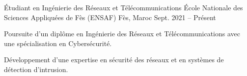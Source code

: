 
\begin{cventries}

  \cventry
  {Étudiant en Ingénierie des Réseaux et Télécommunications} %
  {École Nationale des Sciences Appliquées de Fès (ENSAF)} %
  {Fès, Maroc} %
  {Sept. 2021 – Présent} %
  {
    \begin{cvitems} %
      \item {Poursuite d’un diplôme en Ingénierie des Réseaux et Télécommunications avec une spécialisation en Cybersécurité.}
      \item {Développement d’une expertise en sécurité des réseaux et en systèmes de détection d'intrusion.}
    \end{cvitems}
  }
\end{cventries}
